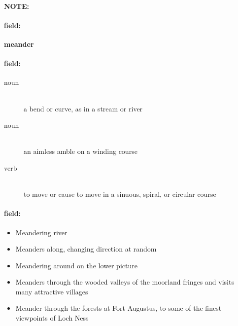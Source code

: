 \documentclass[12pt]{article}
\newenvironment{note}{\paragraph{NOTE:}}{}
\newenvironment{field}{\paragraph{field:}}{}
\begin{document}
\begin{note}
\begin{field}
\textbf{\large meander}
\end{field}


\begin{field}
\begin{description}
\item[noun] \hfill \\ 
a bend or curve, as in a stream or river

\item[noun] \hfill \\ 
an aimless amble on a winding course

\item[verb] \hfill \\ 
to move or cause to move in a sinuous, spiral, or circular course

\end{description}
\end{field}

\begin{field}
\begin{itemize}
\item Meandering river
\item Meanders along, changing direction at random
\item Meandering around on the lower picture
\item Meanders through the wooded valleys of the moorland fringes and visits many attractive villages
\item Meander through the forests at Fort Augustus, to some of the finest viewpoints of Loch Ness
\end{itemize}
\end{field}
\end{note}
\end{document}
